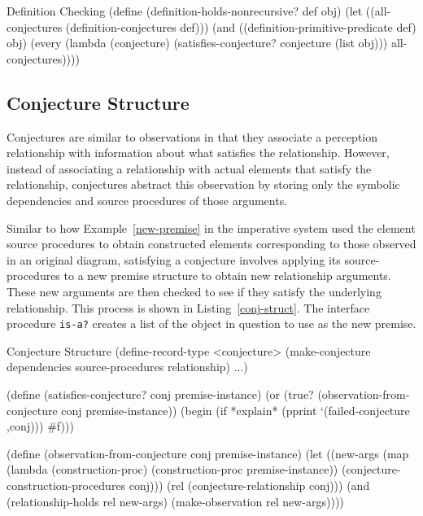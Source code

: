 \begin{code-listing}
[label=def-holds]
{Definition Checking}
(define (definition-holds-nonrecursive? def obj)
  (let ((all-conjectures (definition-conjectures def)))
    (and ((definition-primitive-predicate def) obj)
         (every (lambda (conjecture)
                  (satisfies-conjecture? conjecture (list obj)))
                all-conjectures))))
\end{code-listing}

\subsection{Conjecture Structure}

Conjectures are similar to observations in that they associate a
perception relationship with information about what satisfies the
relationship. However, instead of associating a relationship with
actual elements that satisfy the relationship, conjectures abstract
this observation by storing only the symbolic dependencies and source
procedures of those arguments.

Similar to how Example~\ref{new-premise} in the imperative system used
the element source procedures to obtain constructed elements
corresponding to those observed in an original diagram, satisfying a
conjecture involves applying its source-procedures to a new premise
structure to obtain new relationship arguments. These new arguments
are then checked to see if they satisfy the underlying
relationship. This process is shown in Listing~\ref{conj-struct}. The
interface procedure \texttt{is-a?}  creates a list of the object in
question to use as the new premise.

\begin{code-listing}
[label=conj-struct]
{Conjecture Structure}
(define-record-type <conjecture>
  (make-conjecture dependencies source-procedures relationship) ...)

(define (satisfies-conjecture? conj premise-instance)
  (or (true? (observation-from-conjecture conj premise-instance))
      (begin (if *explain* (pprint `(failed-conjecture ,conj)))
             #f)))

(define (observation-from-conjecture conj premise-instance)
  (let ((new-args
         (map (lambda (construction-proc)
                (construction-proc premise-instance))
          (conjecture-construction-procedures conj)))
        (rel (conjecture-relationship conj)))
    (and (relationship-holds rel new-args)
         (make-observation rel new-args))))
\end{code-listing}

